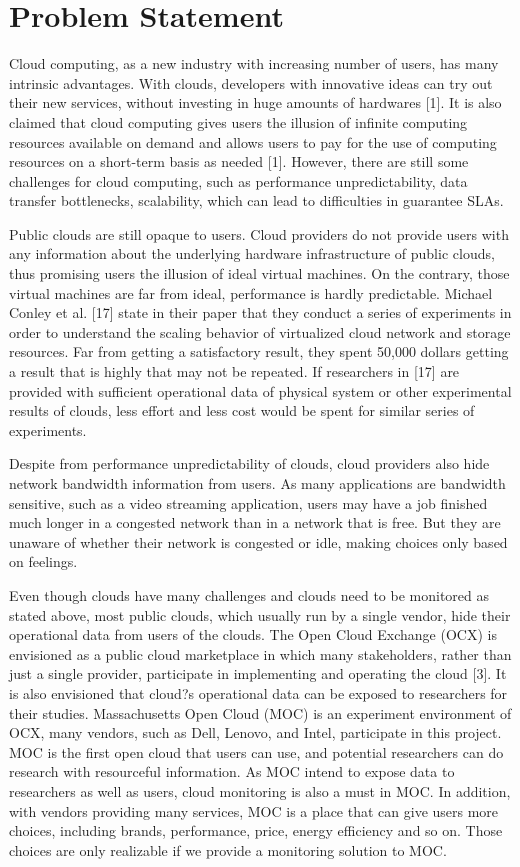\documentclass[11pt, oneside]{article}   	%
\begin{document}
\section{Problem Statement}

	Cloud computing, as a new industry with increasing number of users, has many intrinsic advantages. With clouds, developers with innovative ideas can try out their new services, without investing in huge amounts of hardwares [1]. It is also claimed that cloud computing gives users the illusion of infinite computing resources available on demand and allows users to pay for the use of computing resources on a short-term basis as needed [1]. However, there are still some challenges for cloud computing, such as performance unpredictability, data transfer bottlenecks, scalability, which can lead to difficulties in guarantee SLAs. 
	
	
	Public clouds are still opaque to users. Cloud providers do not provide users with any information about the underlying hardware infrastructure of public clouds, thus promising users the illusion of ideal virtual machines. On the contrary, those virtual machines are far from ideal, performance is hardly predictable. Michael Conley et al. [17] state in their paper  that they conduct a series of experiments in order to understand the scaling behavior of virtualized cloud network and storage resources. Far from getting a satisfactory result, they spent 50,000 dollars getting a result that is highly that may not be repeated. If researchers in [17] are provided with sufficient operational data of physical system  or other experimental results of clouds, less effort and less cost would be spent for similar series of experiments.
	
	
	Despite from performance unpredictability of clouds, cloud providers also hide network bandwidth information from users. As many applications are bandwidth sensitive, such as a video streaming application, users may have a job finished much longer in a congested network than in a network that is free. But they are unaware of whether their network is congested or idle, making choices only based on feelings. 
	
	
	Even though clouds have many challenges and clouds need to be monitored as stated above, most public clouds, which usually run by a single vendor, hide their operational data from users of the clouds. The Open Cloud Exchange (OCX) is envisioned as a public cloud marketplace in which many stakeholders, rather than just a single provider, participate in implementing and operating the cloud [3]. It is also envisioned that cloud?s operational data can be exposed to researchers for their studies. Massachusetts Open Cloud (MOC) is an experiment environment of OCX, many vendors, such as Dell, Lenovo, and Intel, participate in this project. MOC is the first open cloud that users can use, and potential researchers can do research with resourceful information. As MOC intend to expose data to researchers as well as users, cloud monitoring is also a must in MOC. In addition, with vendors providing many services, MOC is a place that can give users more choices, including brands, performance, price, energy efficiency and so on. Those choices are only realizable if we provide a monitoring solution to MOC. 
	
\end{document}
